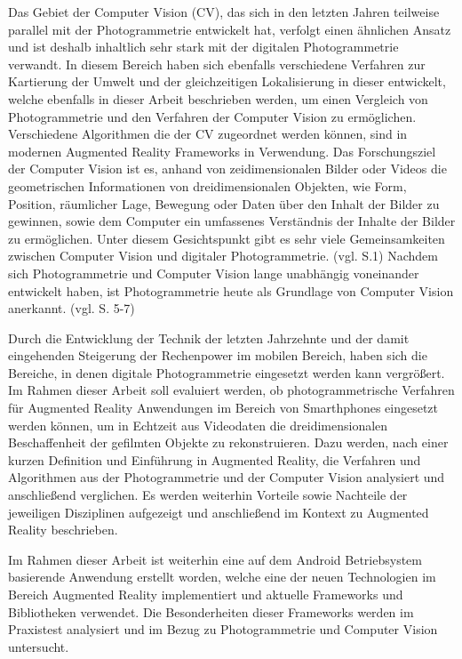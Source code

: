 Das Gebiet der Computer Vision (CV), das sich in den letzten Jahren teilweise parallel mit der Photogrammetrie entwickelt hat, verfolgt einen ähnlichen Ansatz und ist deshalb inhaltlich sehr stark mit der digitalen Photogrammetrie verwandt. In diesem Bereich haben sich ebenfalls verschiedene Verfahren zur Kartierung der Umwelt und der gleichzeitigen Lokalisierung in dieser entwickelt, welche ebenfalls in dieser Arbeit beschrieben werden, um einen Vergleich von Photogrammetrie und den Verfahren der Computer Vision zu ermöglichen. Verschiedene Algorithmen die der CV zugeordnet werden können, sind in modernen Augmented Reality Frameworks in Verwendung. Das Forschungsziel der Computer Vision ist es, anhand von zeidimensionalen Bilder oder Videos die geometrischen Informationen von dreidimensionalen Objekten, wie Form, Position, räumlicher Lage, Bewegung oder Daten über den Inhalt der Bilder zu gewinnen, sowie dem Computer ein umfassenes Verständnis der Inhalte der Bilder zu ermöglichen. Unter diesem Gesichtspunkt gibt es sehr viele Gemeinsamkeiten zwischen Computer Vision und digitaler Photogrammetrie. (vgl. \cite{pose_est_epi} S.1) Nachdem sich Photogrammetrie und Computer Vision lange unabhängig voneinander entwickelt haben, ist Photogrammetrie heute als Grundlage von Computer Vision anerkannt. (vgl. \cite{photo} S. 5-7)

Durch die Entwicklung der Technik der letzten Jahrzehnte und der damit eingehenden Steigerung der Rechenpower im mobilen Bereich, haben sich die Bereiche, in denen digitale Photogrammetrie eingesetzt werden kann vergrößert. Im Rahmen dieser Arbeit soll evaluiert werden, ob photogrammetrische Verfahren für Augmented Reality Anwendungen im Bereich von Smarthphones eingesetzt werden können, um in Echtzeit aus Videodaten die dreidimensionalen Beschaffenheit der gefilmten Objekte zu rekonstruieren. Dazu werden, nach einer kurzen Definition und Einführung in Augmented Reality, die Verfahren und Algorithmen aus der Photogrammetrie und der Computer Vision analysiert und anschließend verglichen. Es werden weiterhin Vorteile sowie Nachteile der jeweiligen Disziplinen aufgezeigt und anschließend im Kontext zu Augmented Reality beschrieben.

Im Rahmen dieser Arbeit ist weiterhin eine auf dem Android Betriebsystem basierende Anwendung erstellt worden, welche eine der neuen Technologien im Bereich Augmented Reality implementiert und aktuelle Frameworks und Bibliotheken verwendet. Die Besonderheiten dieser Frameworks werden im Praxistest analysiert und im Bezug zu Photogrammetrie und Computer Vision untersucht.



  



